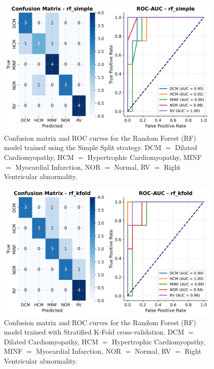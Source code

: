 \begin{figure}
	\begin{center}
		\includegraphics[width=0.99\textwidth]{../images/metrics/rf/rf_simple_metrics.png}
	\end{center}
	\caption{Confusion matrix and ROC curves for the Random Forest (RF) model
		trained using the Simple Split strategy. DCM $=$ Dilated Cardiomyopathy, HCM
		$=$ Hypertrophic Cardiomyopathy, MINF $=$ Myocardial Infarction, NOR $=$
		Normal, RV $=$ Right Ventricular abnormality.}
\end{figure}

\begin{figure}
	\begin{center}
		\includegraphics[width=0.99\textwidth]{../images/metrics/rf/rf_kfold_metrics.png}
	\end{center}
	\caption{Confusion matrix and ROC curves for the Random Forest (RF) model
		trained with Stratified K-Fold cross-validation. DCM $=$ Dilated
		Cardiomyopathy, HCM $=$ Hypertrophic Cardiomyopathy, MINF $=$ Myocardial
		Infarction, NOR $=$ Normal, RV $=$ Right Ventricular abnormality.}
\end{figure}

